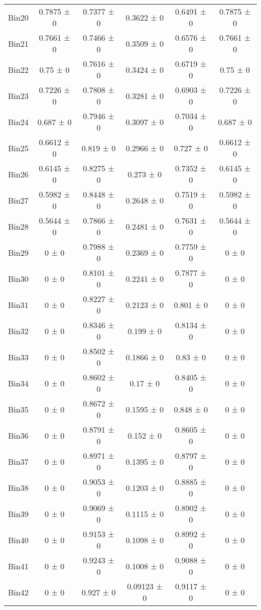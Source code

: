 \begin{tabular}{@{\extracolsep{4pt}}lccccc@{}}
     Bin20 & 0.7875 ± 0 & 0.7377 ± 0 & 0.3622 ± 0 & 0.6491 ± 0 & 0.7875 ± 0 \\ 
     Bin21 & 0.7661 ± 0 & 0.7466 ± 0 & 0.3509 ± 0 & 0.6576 ± 0 & 0.7661 ± 0 \\ 
     Bin22 & 0.75 ± 0 & 0.7616 ± 0 & 0.3424 ± 0 & 0.6719 ± 0 & 0.75 ± 0 \\ 
     Bin23 & 0.7226 ± 0 & 0.7808 ± 0 & 0.3281 ± 0 & 0.6903 ± 0 & 0.7226 ± 0 \\ 
     Bin24 & 0.687 ± 0 & 0.7946 ± 0 & 0.3097 ± 0 & 0.7034 ± 0 & 0.687 ± 0 \\ 
     Bin25 & 0.6612 ± 0 & 0.819 ± 0 & 0.2966 ± 0 & 0.727 ± 0 & 0.6612 ± 0 \\ 
     Bin26 & 0.6145 ± 0 & 0.8275 ± 0 & 0.273 ± 0 & 0.7352 ± 0 & 0.6145 ± 0 \\ 
     Bin27 & 0.5982 ± 0 & 0.8448 ± 0 & 0.2648 ± 0 & 0.7519 ± 0 & 0.5982 ± 0 \\ 
     Bin28 & 0.5644 ± 0 & 0.7866 ± 0 & 0.2481 ± 0 & 0.7631 ± 0 & 0.5644 ± 0 \\ 
     Bin29 & 0 ± 0 & 0.7988 ± 0 & 0.2369 ± 0 & 0.7759 ± 0 & 0 ± 0 \\ 
     Bin30 & 0 ± 0 & 0.8101 ± 0 & 0.2241 ± 0 & 0.7877 ± 0 & 0 ± 0 \\ 
     Bin31 & 0 ± 0 & 0.8227 ± 0 & 0.2123 ± 0 & 0.801 ± 0 & 0 ± 0 \\ 
     Bin32 & 0 ± 0 & 0.8346 ± 0 & 0.199 ± 0 & 0.8134 ± 0 & 0 ± 0 \\ 
     Bin33 & 0 ± 0 & 0.8502 ± 0 & 0.1866 ± 0 & 0.83 ± 0 & 0 ± 0 \\ 
     Bin34 & 0 ± 0 & 0.8602 ± 0 & 0.17 ± 0 & 0.8405 ± 0 & 0 ± 0 \\ 
     Bin35 & 0 ± 0 & 0.8672 ± 0 & 0.1595 ± 0 & 0.848 ± 0 & 0 ± 0 \\ 
     Bin36 & 0 ± 0 & 0.8791 ± 0 & 0.152 ± 0 & 0.8605 ± 0 & 0 ± 0 \\ 
     Bin37 & 0 ± 0 & 0.8971 ± 0 & 0.1395 ± 0 & 0.8797 ± 0 & 0 ± 0 \\ 
     Bin38 & 0 ± 0 & 0.9053 ± 0 & 0.1203 ± 0 & 0.8885 ± 0 & 0 ± 0 \\ 
     Bin39 & 0 ± 0 & 0.9069 ± 0 & 0.1115 ± 0 & 0.8902 ± 0 & 0 ± 0 \\ 
     Bin40 & 0 ± 0 & 0.9153 ± 0 & 0.1098 ± 0 & 0.8992 ± 0 & 0 ± 0 \\ 
     Bin41 & 0 ± 0 & 0.9243 ± 0 & 0.1008 ± 0 & 0.9088 ± 0 & 0 ± 0 \\ 
     Bin42 & 0 ± 0 & 0.927 ± 0 & 0.09123 ± 0 & 0.9117 ± 0 & 0 ± 0 \\ 

\end{tabular}
